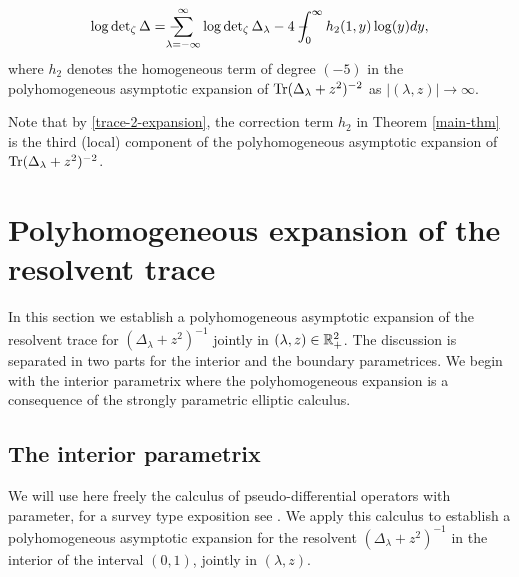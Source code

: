 \begin{theorem}
\label{main-thm}
\begin{align}
\log \det\nolimits_{\zeta} \Delta = \regsum_{\lambda=-\infty}^\infty \log \det\nolimits_{\zeta} \Delta_\lambda 
- 4 \regint_0^\infty h_{2}(1,y) \log (y) dy,
\end{align}
where $h_{2}$ denotes the homogeneous term of degree $(-5)$ in the 
polyhomogeneous asymptotic expansion of $\textup{Tr}(\Delta_\lambda + z^2)^{-2}$
as $|(\lambda, z)|\to \infty$.
\end{theorem}

Note that by \eqref{trace-2-expansion}, the correction term $h_{2}$ in Theorem \ref{main-thm}
is the third (local) component of the polyhomogeneous asymptotic expansion of 
$\textup{Tr}(\Delta_\lambda + z^2)^{-2}$.


\section{Polyhomogeneous expansion of the resolvent trace}
In this section we establish a polyhomogeneous asymptotic expansion of the 
resolvent trace for $(\Delta_\lambda+z^2)^{-1}$ jointly in $(\lambda,z)\in \mathbb{R}_+^2$. 
The discussion is separated in two parts for the interior and the boundary parametrices. 
We begin with the interior parametrix where the polyhomogeneous expansion is 
a consequence of the strongly parametric elliptic calculus. 

\subsection{The interior parametrix}
We will use here freely the calculus of pseudo-differential operators 
with parameter, for a survey type exposition see \cite[Sec. 4 and 5]{Les:PDO}.
We apply this calculus to establish a polyhomogeneous asymptotic expansion 
for the resolvent $(\Delta_\lambda +z^2)^{-1}$ in the interior of the interval $(0,1)$,
jointly in $(\lambda, z)$. 


